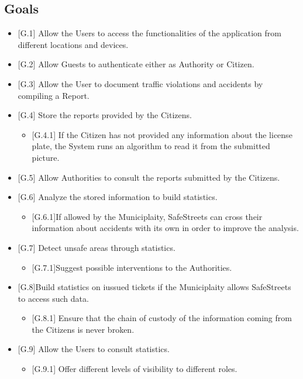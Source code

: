 \documentclass{report}
\begin{document}
\subsection{Goals}
\begin{itemize}
    \item {[G.1]} Allow the Users to access the functionalities of the application from different locations and devices.
	\item {[G.2]} Allow Guests to authenticate either as Authority or Citizen.
    \item {[G.3]} Allow the User to document traffic violations and accidents by compiling a Report.
    \item {[G.4]} Store the reports provided by the Citizens.
    \begin{itemize}
    		\item {[G.4.1]} If the Citizen has not provided any information about the license plate, the System runs an algorithm to read it from the submitted picture.
		\end{itemize}     
	\item {[G.5]} Allow Authorities to consult the reports submitted by the Citizens.
    \item {[G.6]} Analyze the stored information to build statistics.
    \begin{itemize}
    		\item {[G.6.1]}If allowed by the Municiplaity, SafeStreets can cross their information about accidents with its own in order to improve the analysis.
	\end{itemize}  
	\item {[G.7]} Detect unsafe areas through statistics.
	\begin{itemize}
		\item {[G.7.1]}Suggest possible interventions to the Authorities.
	\end{itemize}
	\item{[G.8]}Build statistics on iussued tickets if the Municiplaity allows SafeStreets to access such data.
    \begin{itemize}
        \item {[G.8.1]} Ensure that the chain of custody of the information coming from the Citizens is never broken.
	\end{itemize}
	\item {[G.9]} Allow the Users to consult statistics.
	\begin{itemize}
		\item {[G.9.1]} Offer different levels of visibility to different roles.
	\end{itemize}
\end{itemize}
\end{document}
